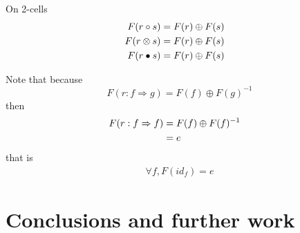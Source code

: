 \documentclass[a4paper]{article}
\begin{document}
On 2-cells
\begin{align}
F(r \circ s) &= F(r) \oplus F(s) \cr
F(r \otimes s) &= F(r) \oplus F(s) \cr
F(r \bullet s) &= F(r) \oplus F(s)
\end{align}

\begin{remark}
Note that because
\[
F(r: f \Rightarrow g) = F(f) \oplus F(g)^{-1}
\]
then
\begin{align}
F(r: f \Rightarrow f) &= F(f) \oplus F(f)^{-1} \cr
&= e
\end{align}
that is
\begin{align}
\forall f, F(id_f) = e
\end{align}
\end{remark}


\section{Conclusions and further work}
\label{sec:conclusion}



\small

\end{document}
